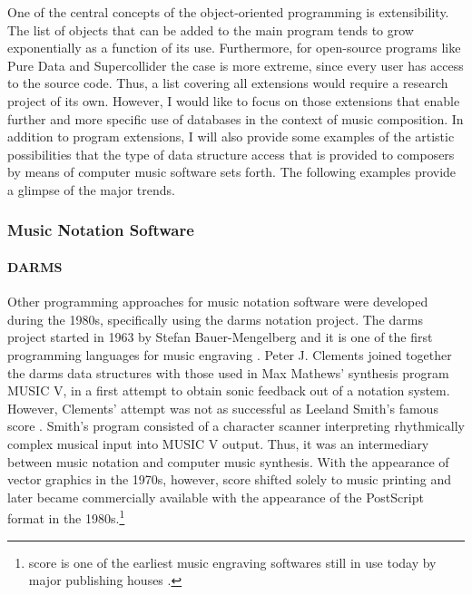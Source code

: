 One of the central concepts of the object-oriented programming is extensibility. The list of objects that can be added to the main program tends to grow exponentially as a function of its use. Furthermore, for open-source programs like Pure Data and Supercollider the case is more extreme, since every user has access to the source code. Thus, a list covering all extensions would require a research project of its own. However, I would like to focus on those extensions that enable further and more specific use of databases in the context of music composition. In addition to program extensions, I will also provide some examples of the artistic possibilities that the type of data structure access that is provided to composers by means of computer music software sets forth. The following examples provide a glimpse of the major trends.

\subsubsection{Music Notation Software}
\label{computer:notation}

\paragraph{DARMS}
Other programming approaches for music notation software were developed during the 1980s, specifically using the \gls{darms} notation project. The \gls{darms} project started in 1963 by Stefan Bauer-Mengelberg and it is one of the first programming languages for music engraving \parencite{icmc/bbp2372.1983.002, 10.2307/30204239}. Peter J. Clements \parencite{icmc/bbp2372.1980.020} joined together the \gls{darms} data structures with those used in Max Mathews' synthesis program MUSIC V, in a first attempt to obtain sonic feedback out of a notation system. However, Clements' attempt was not as successful as Leeland Smith's famous \gls{score} \parencite{smith1971}. Smith's program consisted of a character scanner interpreting rhythmically complex musical input into MUSIC V output. Thus, it was an intermediary between music notation and computer music synthesis. With the appearance of vector graphics in the 1970s, however, \gls{score} shifted solely to music printing and later became commercially available with the appearance of the 	PostScript format in the 1980s.\footnote{\gls{score} is one of the earliest music engraving softwares still in use today by major publishing houses \parencite{scoremus}.}

